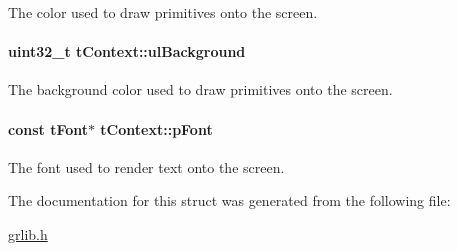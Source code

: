 The color used to draw primitives onto the screen. 

\paragraph[{ul\+Background}]{\setlength{\rightskip}{0pt plus 5cm}uint32\+\_\+t t\+Context\+::ul\+Background}\label{structt_context_ab10941c8887fb09b2d909c21f2f16390}


The background color used to draw primitives onto the screen. 

\paragraph[{p\+Font}]{\setlength{\rightskip}{0pt plus 5cm}const {\bf t\+Font}$\ast$ t\+Context\+::p\+Font}\label{structt_context_affa1b2961910a9716369945476ae89fe}


The font used to render text onto the screen. 



The documentation for this struct was generated from the following file\+:\begin{DoxyCompactItemize}
\item 
\hyperlink{grlib_8h}{grlib.\+h}\end{DoxyCompactItemize}
